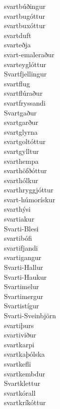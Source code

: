 \documentclass[../samsetningasafn.tex]{subfiles}
\begin{document}
\begin{bigwordlist}
\begin{footnotesize}
\begin{multicols}{4}
\begin{description}
		\item [svartbúðingur]
		\item [svartbugóttur]
		\item [svartbuxóttur]
		\item [svartduft]
		\item [svarteðja]
		\item [svart-emaleraður]
		\item [svarteyglóttur]
		\item [Svartfjellingur]
		\item [svartflug]
		\item [svartflúraður]
		\item [svartfryssandi]
		\item [Svartgaður]
		\item [svartgarður]
		\item [svartglyrna]
		\item [svartgoltóttur]
		\item [svartgylltur]
		\item [svarthempa]
		\item [svarthöfðóttur]
		\item [svarthólkur]
		\item [svarthryggjóttur]
		\item [svart-húmorískur]
		\item [svarthýsi]
		\item [svartiakur]
		\item [Svarti-Blesi]
		\item [svartibófi]
		\item [svartifjandi]
		\item [svartigangur]
		\item [Svarti-Hallur]
		\item [Svarti-Haukur]
		\item [Svartimelur]	
		\item [Svartimergur]
		\item [Svartistígur]
		\item [Svarti-Sveinbjörn]
		\item [svartiþurs]
		\item [svartiviður]
		\item [svartkarpi]
		\item [svartkaþólska]
		\item [svartkefli]
		\item [svartkembdur]
		\item [Svartklettur]
		\item [svartkórall]
		\item [svartkríkóttur]

\end{description}
\end{multicols}
\end{footnotesize}
\end{bigwordlist}
\end{document}
